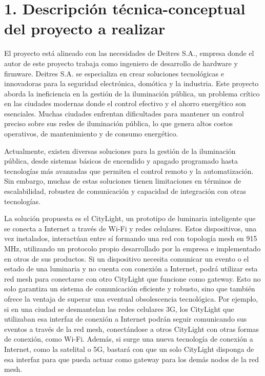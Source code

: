 \documentclass[
11pt, %
]{charter}
\begin{document}
\section{1. Descripción técnica-conceptual del proyecto a realizar}
\label{sec:descripcion}

El proyecto está alineado con las necesidades de Deitres S.A., empresa donde el autor de este proyecto trabaja como ingeniero de desarrollo de hardware y firmware. Deitres S.A. se especializa en crear soluciones tecnológicas e innovadoras para la seguridad electrónica, domótica y la industria. Este proyecto aborda la ineficiencia en la gestión de la iluminación pública, un problema crítico en las ciudades modernas donde el control efectivo y el ahorro energético son esenciales. Muchas ciudades enfrentan dificultades para mantener un control preciso sobre sus redes de iluminación pública, lo que genera altos costos operativos, de mantenimiento y de consumo energético.

Actualmente, existen diversas soluciones para la gestión de la iluminación pública, desde sistemas básicos de encendido y apagado programado hasta tecnologías más avanzadas que permiten el control remoto y la automatización. Sin embargo, muchas de estas soluciones tienen limitaciones en términos de escalabilidad, robustez de comunicación y capacidad de integración con otras tecnologías.

La solución propuesta es el CityLight, un prototipo de luminaria inteligente que se conecta a Internet a través de Wi-Fi y redes celulares. Estos dispositivos, una vez instalados, interactúan entre sí formando una red con topología mesh en 915 MHz, utilizando un protocolo propio desarrollado por la empresa e implementado en otros de sus productos. Si un dispositivo necesita comunicar un evento o el estado de una luminaria y no cuenta con conexión a Internet, podrá utilizar esta red mesh para conectarse con otro CityLight que funcione como gateway. Esto no solo garantiza un sistema de comunicación eficiente y robusto, sino que también ofrece la ventaja de superar una eventual obsolescencia tecnológica. Por ejemplo, si en una ciudad se desmantelan las redes celulares 3G, los CityLight que utilizaban esa interfaz de conexión a Internet podrán seguir comunicando sus eventos a través de la red mesh, conectándose a otros CityLight con otras formas de conexión, como Wi-Fi. Además, si surge una nueva tecnología de conexión a Internet, como la satelital o 5G, bastará con que un solo CityLight disponga de esa interfaz para que pueda actuar como gateway para los demás nodos de la red mesh.
\end{document}
